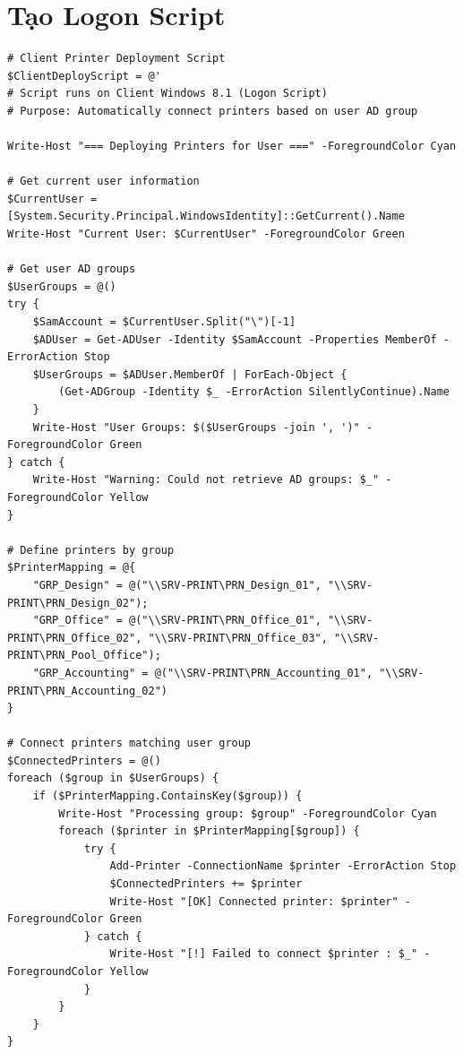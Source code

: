 \section{Tạo Logon Script}
\begin{lstlisting}[style=powershell]
# Client Printer Deployment Script
$ClientDeployScript = @'
# Script runs on Client Windows 8.1 (Logon Script)
# Purpose: Automatically connect printers based on user AD group
 
Write-Host "=== Deploying Printers for User ===" -ForegroundColor Cyan
 
# Get current user information
$CurrentUser = [System.Security.Principal.WindowsIdentity]::GetCurrent().Name
Write-Host "Current User: $CurrentUser" -ForegroundColor Green
 
# Get user AD groups
$UserGroups = @()
try {
    $SamAccount = $CurrentUser.Split("\")[-1]
    $ADUser = Get-ADUser -Identity $SamAccount -Properties MemberOf -ErrorAction Stop
    $UserGroups = $ADUser.MemberOf | ForEach-Object {
        (Get-ADGroup -Identity $_ -ErrorAction SilentlyContinue).Name
    }
    Write-Host "User Groups: $($UserGroups -join ', ')" -ForegroundColor Green
} catch {
    Write-Host "Warning: Could not retrieve AD groups: $_" -ForegroundColor Yellow
}
 
# Define printers by group
$PrinterMapping = @{
    "GRP_Design" = @("\\SRV-PRINT\PRN_Design_01", "\\SRV-PRINT\PRN_Design_02");
    "GRP_Office" = @("\\SRV-PRINT\PRN_Office_01", "\\SRV-PRINT\PRN_Office_02", "\\SRV-PRINT\PRN_Office_03", "\\SRV-PRINT\PRN_Pool_Office");
    "GRP_Accounting" = @("\\SRV-PRINT\PRN_Accounting_01", "\\SRV-PRINT\PRN_Accounting_02")
}
 
# Connect printers matching user group
$ConnectedPrinters = @()
foreach ($group in $UserGroups) {
    if ($PrinterMapping.ContainsKey($group)) {
        Write-Host "Processing group: $group" -ForegroundColor Cyan
        foreach ($printer in $PrinterMapping[$group]) {
            try {
                Add-Printer -ConnectionName $printer -ErrorAction Stop
                $ConnectedPrinters += $printer
                Write-Host "[OK] Connected printer: $printer" -ForegroundColor Green
            } catch {
                Write-Host "[!] Failed to connect $printer : $_" -ForegroundColor Yellow
            }
        }
    }
}
 

\end{lstlisting}
